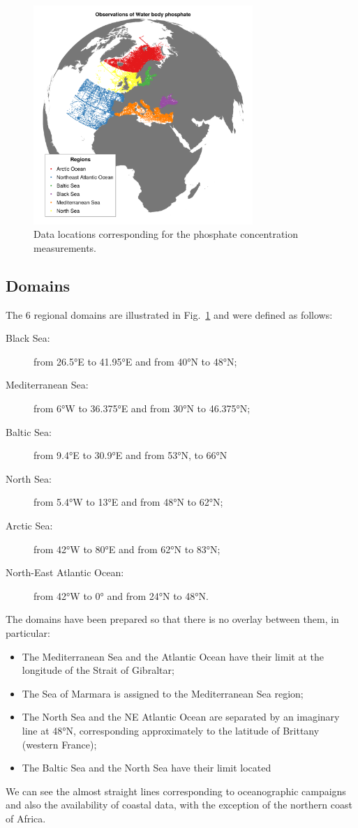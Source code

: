 \documentclass[essd, manuscript]{copernicus}
\begin{document}
\begin{figure}[t]
\includegraphics[width=8.3cm]{observations_Water_body_phosphate.png}
\caption{Data locations corresponding for the phosphate concentration measurements.\label{fig:phosphatedata}}
\end{figure}



\subsection{Domains}
The 6 regional domains are illustrated in Fig.~\ref{fig:phosphatedata} and were defined as follows:
\begin{description}
\item[Black Sea:] from 26.5°E to 41.95°E and from 40°N to 48°N;
\item[Mediterranean Sea:] from 6°W to 36.375°E and from 30°N to 46.375°N;
\item[Baltic Sea:] from 9.4°E to 30.9°E and from 53°N, to 66°N
\item[North Sea:] from 5.4°W to 13°E and from 48°N to 62°N;
\item[Arctic Sea:] from 42°W to 80°E and from 62°N to 83°N;
\item[North-East Atlantic Ocean:] from 42°W to 0° and from 24°N to 48°N.
\end{description}

		
The domains have been prepared so that there is no overlay between them, in particular: 
\begin{itemize}
\item The Mediterranean Sea and the Atlantic Ocean have their limit at the longitude of the Strait of Gibraltar;
\item The Sea of Marmara is assigned to the Mediterranean Sea region;
\item The North Sea and the NE Atlantic Ocean are separated by an imaginary line at 48°N, corresponding approximately to the latitude of Brittany (western France);
\item The Baltic Sea and the North Sea have their limit located 
\end{itemize}
We can see the almost straight lines corresponding to oceanographic campaigns and also the availability of coastal data, with the exception of the northern coast of Africa. 
\end{document}
